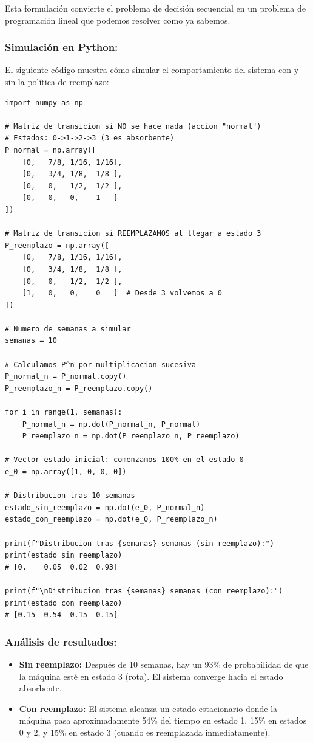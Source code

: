 \documentclass[a4paper,11pt]{article}
\begin{document}
Esta formulación convierte el problema de decisión secuencial en un problema de programación lineal que podemos resolver como ya sabemos.

\subsubsection{Simulación en Python:}

El siguiente código muestra cómo simular el comportamiento del sistema con y sin la política de reemplazo:

\begin{lstlisting}
import numpy as np

# Matriz de transicion si NO se hace nada (accion "normal")
# Estados: 0->1->2->3 (3 es absorbente)
P_normal = np.array([
    [0,   7/8, 1/16, 1/16],
    [0,   3/4, 1/8,  1/8 ],
    [0,   0,   1/2,  1/2 ],
    [0,   0,   0,    1   ]
])

# Matriz de transicion si REEMPLAZAMOS al llegar a estado 3
P_reemplazo = np.array([
    [0,   7/8, 1/16, 1/16],
    [0,   3/4, 1/8,  1/8 ],
    [0,   0,   1/2,  1/2 ],
    [1,   0,   0,    0   ]  # Desde 3 volvemos a 0
])

# Numero de semanas a simular
semanas = 10

# Calculamos P^n por multiplicacion sucesiva
P_normal_n = P_normal.copy()
P_reemplazo_n = P_reemplazo.copy()

for i in range(1, semanas):
    P_normal_n = np.dot(P_normal_n, P_normal)
    P_reemplazo_n = np.dot(P_reemplazo_n, P_reemplazo)

# Vector estado inicial: comenzamos 100% en el estado 0
e_0 = np.array([1, 0, 0, 0])

# Distribucion tras 10 semanas
estado_sin_reemplazo = np.dot(e_0, P_normal_n)
estado_con_reemplazo = np.dot(e_0, P_reemplazo_n)

print(f"Distribucion tras {semanas} semanas (sin reemplazo):")
print(estado_sin_reemplazo)
# [0.    0.05  0.02  0.93]

print(f"\nDistribucion tras {semanas} semanas (con reemplazo):")
print(estado_con_reemplazo)
# [0.15  0.54  0.15  0.15]
\end{lstlisting}

\subsubsection{Análisis de resultados:}

\begin{itemize}
    \item \textbf{Sin reemplazo:} Después de 10 semanas, hay un 93\% de probabilidad de que la máquina esté en estado 3 (rota). El sistema converge hacia el estado absorbente.

    \item \textbf{Con reemplazo:} El sistema alcanza un estado estacionario donde la máquina pasa aproximadamente 54\% del tiempo en estado 1, 15\% en estados 0 y 2, y 15\% en estado 3 (cuando es reemplazada inmediatamente).
\end{itemize}
\end{document}
